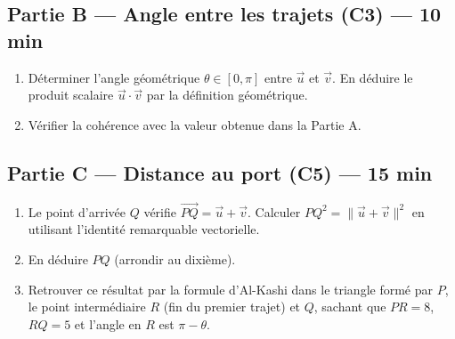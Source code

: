 
\bigskip

\subsection*{Partie B — Angle entre les trajets (C3) — 10 min}

\begin{enumerate}[resume]
  \item Déterminer l'angle géométrique $\theta\in[0,\pi]$ entre $\vec u$ et $\vec v$. En déduire le produit scalaire $\vec u\cdot\vec v$ par la définition géométrique.
  \item Vérifier la cohérence avec la valeur obtenue dans la Partie A.
\end{enumerate}


\bigskip

\subsection*{Partie C — Distance au port (C5) — 15 min}

\begin{enumerate}[resume]
  \item Le point d'arrivée $Q$ vérifie $\overrightarrow{PQ} = \vec{u} + \vec{v}$. Calculer $PQ^2 = \|\vec{u} + \vec{v}\|^2$ en utilisant l'identité remarquable vectorielle.
  \item En déduire $PQ$ (arrondir au dixième).
  \item Retrouver ce résultat par la formule d'Al-Kashi dans le triangle formé par $P$, le point intermédiaire $R$ (fin du premier trajet) et $Q$, sachant que $PR = 8$, $RQ = 5$ et l'angle en $R$ est $\pi - \theta$.
\end{enumerate}

